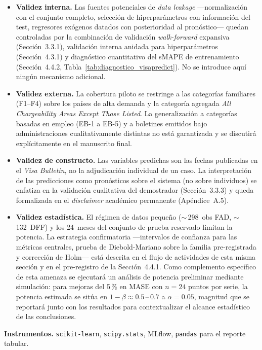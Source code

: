 \documentclass[12pt,letterpaper]{report}
\begin{document}
\begin{itemize}[leftmargin=1.4cm, itemsep=3pt, topsep=2pt]
    \item \textbf{Validez interna.} Las fuentes potenciales de \textit{data leakage} ---normalización con el conjunto completo, selección de hiperparámetros con información del test, regresores exógenos datados con posterioridad al pronóstico--- quedan controladas por la combinación de validación \textit{walk-forward} expansiva (Sección~3.3.1), validación interna anidada para hiperparámetros (Sección~4.3.1) y diagnóstico cuantitativo del sMAPE de entrenamiento (Sección~4.4.2, Tabla~\ref{tab:diagnostico_visapredict}). No se introduce aquí ningún mecanismo adicional.
    \item \textbf{Validez externa.} La cobertura piloto se restringe a las categorías familiares (F1--F4) sobre los países de alta demanda y la categoría agregada \textit{All Chargeability Areas Except Those Listed}. La generalización a categorías basadas en empleo (EB-1 a EB-5) y a boletines emitidos bajo administraciones cualitativamente distintas no está garantizada y se discutirá explícitamente en el manuscrito final.
    \item \textbf{Validez de constructo.} Las variables predichas son las fechas publicadas en el \textit{Visa Bulletin}, no la adjudicación individual de un caso. La interpretación de las predicciones como pronósticos sobre el sistema (no sobre individuos) se enfatiza en la validación cualitativa del demostrador (Sección~3.3.3) y queda formalizada en el \textit{disclaimer} académico permanente (Apéndice~A.5).
    \item \textbf{Validez estadística.} El régimen de datos pequeño ($\sim$\,298~obs FAD, $\sim$\,132~DFF) y los 24~meses del conjunto de prueba reservado limitan la potencia. La estrategia confirmatoria ---intervalos de confianza para las métricas centrales, prueba de Diebold-Mariano sobre la familia pre-registrada y corrección de Holm--- está descrita en el flujo de actividades de esta misma sección y en el pre-registro de la Sección~4.4.1. Como complemento específico de esta amenaza se ejecutará un análisis de potencia preliminar mediante simulación: para mejoras del 5\,\% en MASE con $n = 24$ puntos por serie, la potencia estimada se sitúa en $1 - \beta \approx 0{.}5$\,--\,$0{.}7$ a $\alpha = 0{.}05$, magnitud que se reportará junto con los resultados para contextualizar el alcance estadístico de las conclusiones.
\end{itemize}

\textbf{Instrumentos.} \texttt{scikit-learn}, \texttt{scipy.stats}, MLflow, \texttt{pandas} para el reporte tabular.
\end{document}

